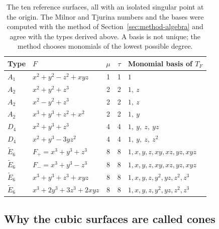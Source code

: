 \begin{table}[!h]
\centering
\small
\begin{tabular}{l l c c l}
\toprule
Type & $F$ & $\mu$ & $\tau$ & Monomial basis of $T_F$ \\
\midrule
$A_1$ & $x^2+y^2-z^2+xyz$ & 1 & 1 & $1$ \\
$A_2$ & $x^2+y^2+z^3$ & 2 & 2 & $1,\ z$ \\
$A_2$ & $x^2-y^2+z^3$ & 2 & 2 & $1,\ z$ \\
$A_2$ & $x^3+y^3+z^2+x^2$ & 2 & 2 & $1,\ y$ \\
$D_4$ & $x^2+y^3+z^3$ & 4 & 4 & $1,\ y,\ z,\ yz$ \\
$D_4$ & $x^2+y^3-3yz^2$ & 4 & 4 & $1,\ y,\ z,\ z^2$ \\
$\tilde E_6$ & $F_+=x^3+y^3+z^3$ & 8 & 8 & $1,x,y,z,xy,xz,yz,xyz$ \\
$\tilde E_6$ & $F_-=x^3+y^3-z^3$ & 8 & 8 & $1,x,y,z,xy,xz,yz,xyz$ \\
$\tilde E_6$ & $x^3+y^3+z^3+xyz$ & 8 & 8 & $1,x,y,z,y^2,yz,z^2,z^3$ \\
$\tilde E_6$ & $x^3+2y^3+3z^3+2xyz$ & 8 & 8 & $1,x,y,z,y^2,yz,z^2,z^3$ \\
\bottomrule
\end{tabular}
\caption[Reference surfaces]{The ten reference surfaces, all with an isolated
singular point at the origin. The Milnor and Tjurina numbers and the bases were
computed with the method of Section~\ref{sec:method-algebra} and agree with the
types derived above. A basis is not unique; the method chooses monomials of
the lowest possible degree.}
\label{tab:reference-surfaces}
\end{table}

\subsection{Why the cubic surfaces are called cones}
\label{sec:cones}

